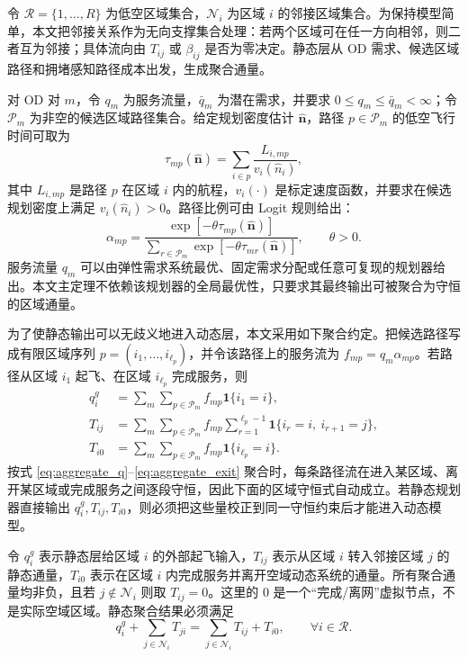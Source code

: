 \documentclass[a4paper,12pt]{article}
\theoremstyle{plain}
\theoremstyle{definition}
\theoremstyle{remark}
\begin{document}
令 $\mathcal R=\{1,\ldots,R\}$ 为低空区域集合，$\mathcal N_i$ 为区域 $i$ 的邻接区域集合。为保持模型简单，本文把邻接关系作为无向支撑集合处理：若两个区域可在任一方向相邻，则二者互为邻接；具体流向由 $T_{ij}$ 或 $\beta_{ij}$ 是否为零决定。静态层从 OD 需求、候选区域路径和拥堵感知路径成本出发，生成聚合通量。

对 OD 对 $m$，令 $q_m$ 为服务流量，$\bar q_m$ 为潜在需求，并要求 $0\le q_m\le \bar q_m<\infty$；令 $\mathcal P_m$ 为非空的候选区域路径集合。给定规划密度估计 $\hat{\bm n}$，路径 $p\in\mathcal P_m$ 的低空飞行时间可取为
\begin{equation}\label{eq:path_time}
    \tau_{mp}(\hat{\bm n})
    =
    \sum_{i\in p}\frac{L_{i,mp}}{v_i(\hat n_i)} ,
\end{equation}
其中 $L_{i,mp}$ 是路径 $p$ 在区域 $i$ 内的航程，$v_i(\cdot)$ 是标定速度函数，并要求在候选规划密度上满足 $v_i(\hat n_i)>0$。路径比例可由 Logit 规则给出：
\begin{equation}\label{eq:logit}
    \alpha_{mp}
    =
    \frac{\exp[-\theta \tau_{mp}(\hat{\bm n})]}
    {\sum_{r\in\mathcal P_m}\exp[-\theta \tau_{mr}(\hat{\bm n})]},
    \qquad \theta>0 .
\end{equation}
服务流量 $q_m$ 可以由弹性需求系统最优、固定需求分配或任意可复现的规划器给出。本文主定理不依赖该规划器的全局最优性，只要求其最终输出可被聚合为守恒的区域通量。

为了使静态输出可以无歧义地进入动态层，本文采用如下聚合约定。把候选路径写成有限区域序列
$p=(i_1,\ldots,i_{\ell_p})$，并令该路径上的服务流为 $f_{mp}=q_m\alpha_{mp}$。若路径从区域 $i_1$ 起飞、在区域 $i_{\ell_p}$ 完成服务，则
\begin{align}
    q_i^g
    &=
    \sum_m\sum_{p\in\mathcal P_m} f_{mp}\mathbf 1\{i_1=i\}, \label{eq:aggregate_q}\\
    T_{ij}
    &=
    \sum_m\sum_{p\in\mathcal P_m} f_{mp}
    \sum_{r=1}^{\ell_p-1}\mathbf 1\{i_r=i,\ i_{r+1}=j\}, \label{eq:aggregate_T}\\
    T_{i0}
    &=
    \sum_m\sum_{p\in\mathcal P_m} f_{mp}\mathbf 1\{i_{\ell_p}=i\}. \label{eq:aggregate_exit}
\end{align}
按式 \eqref{eq:aggregate_q}--\eqref{eq:aggregate_exit} 聚合时，每条路径流在进入某区域、离开某区域或完成服务之间逐段守恒，因此下面的区域守恒式自动成立。若静态规划器直接输出 $q_i^g,T_{ij},T_{i0}$，则必须把这些量校正到同一守恒约束后才能进入动态模型。

令 $q_i^g$ 表示静态层给区域 $i$ 的外部起飞输入，$T_{ij}$ 表示从区域 $i$ 转入邻接区域 $j$ 的静态通量，$T_{i0}$ 表示在区域 $i$ 内完成服务并离开空域动态系统的通量。所有聚合通量均非负，且若 $j\notin\mathcal N_i$ 则取 $T_{ij}=0$。这里的 $0$ 是一个“完成/离网”虚拟节点，不是实际空域区域。静态聚合结果必须满足
\begin{equation}\label{eq:static_conservation}
    q_i^g+\sum_{j\in\mathcal N_i}T_{ji}
    =
    \sum_{j\in\mathcal N_i}T_{ij}+T_{i0},
    \qquad \forall i\in\mathcal R .
\end{equation}
\end{document}
